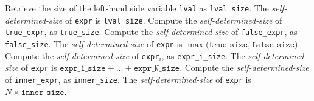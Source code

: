 \documentclass{article}
\newcommand{\sds}{\emph{self-determined-size}}
\begin{document}
\begin{algorithm}
\begin{algorithmic}[1]
    \State Retrieve the size of the left-hand side variable \texttt{lval} as \texttt{lval\_size}.
    \State The \sds{} of \texttt{expr} is \texttt{lval\_size}.
    \ENDWHEN
    \State Compute the \sds{} of \texttt{true\_expr}, as \texttt{true\_size}.
    \State Compute the \sds{} of \texttt{false\_expr}, as \texttt{false\_size}.
    \State The \sds{} of \texttt{expr} is $\max\big(\texttt{true\_size}, \texttt{false\_size}\big)$.
    \ENDWHEN
    \State Compute the \sds{} of \texttt{expr}$_{i}$, as \texttt{expr\_i\_size}.
    \EndFor
    \State The \sds{} of \texttt{expr} is $\texttt{expr\_1\_size} + \dots + \texttt{expr\_N\_size}$.
    \ENDWHEN
    \State Compute the \sds{} of \texttt{inner\_expr}, as \texttt{inner\_size}.
    \State The \sds{} of \texttt{expr} is $N \times \texttt{inner\_size}$.
    \ENDWHEN
    \ENDSWITCH
    \EndProcedure
  \end{algorithmic}
\end{algorithm}
\end{document}
